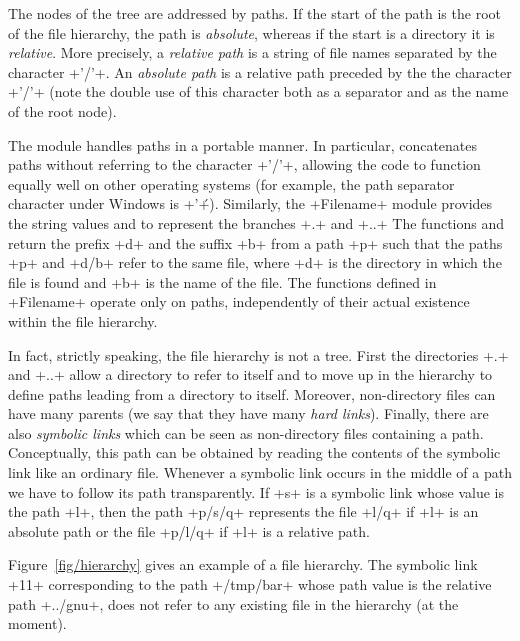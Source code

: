 The nodes of the tree are addressed by paths. If the start of the path
is the root of the file hierarchy, the path is \emph{absolute}, whereas if the
start is a directory it is \emph{relative}. More precisely, a \emph{relative
  path} is a string of file names separated by the character
\ml+'/'+.  An \emph{absolute path} is a relative path preceded by the
the character \ml+'/'+ (note the double use of this character both as
a separator and as the name of the root node).

The  module handles paths in a portable
manner. In particular,  concatenates paths without
referring to the character \ml+'/'+, allowing the code to function equally
well on other operating systems (for example, the path separator character
under Windows is \ml+'\'+).  Similarly, the \ml+Filename+ module
provides the string values  and
 to represent the branches
\ml+.+ and \ml+..+ The functions  and
 return the prefix \ml+d+ and the suffix
\ml+b+ from a path \ml+p+ such that the paths \ml+p+ and
\ml+d/b+ refer to the same file, where \ml+d+ is the directory in
which the file is found and \ml+b+ is the name of the file. The
functions defined in \ml+Filename+ operate only on paths,
independently of their actual existence within the file hierarchy.

In fact, strictly speaking, the file hierarchy is not a tree. First
the directories \ml+.+ and \ml+..+ allow a directory to refer to
itself and to move up in the hierarchy to define paths leading from a
directory to itself. Moreover, non-directory files can have many
parents (we say that they have many \emph{hard links}). Finally,
there are also \emph{symbolic links} which can be seen as
non-directory files containing a path. Conceptually, this path can be
obtained by reading the contents of the symbolic link like an ordinary
file. Whenever a symbolic link occurs in the middle of a path we have
to follow its path transparently. If \ml+s+ is a symbolic link whose
value is the path \ml+l+, then the path \ml+p/s/q+ represents the file
\ml+l/q+ if \ml+l+ is an absolute path or the file \ml+p/l/q+ if
\ml+l+ is a relative path.

Figure~\ref{fig/hierarchy} gives an example of a file hierarchy.  The
symbolic link \ml+11+ corresponding to the path \ml+/tmp/bar+ whose
path value is the relative path \ml+../gnu+, does not refer to any
existing file in the hierarchy (at the moment).

